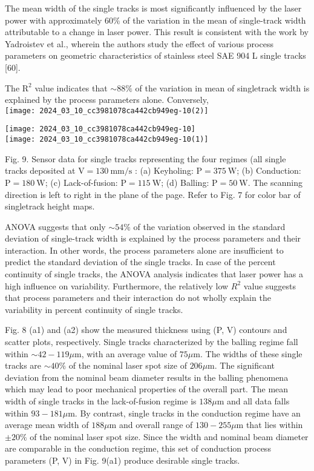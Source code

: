 \documentclass[10pt]{article}
\begin{document}
The mean width of the single tracks is most significantly influenced by the laser power with approximately $60 \%$ of the variation in the mean of single-track width attributable to a change in laser power. This result is consistent with the work by Yadroistev et al., wherein the authors study the effect of various process parameters on geometric characteristics of stainless steel SAE 904 L single tracks [60].

The $\mathrm{R}^{2}$ value indicates that $\sim 88 \%$ of the variation in mean of singletrack width is explained by the process parameters alone. Conversely,\\
\texttt{[image: 2024\_03\_10\_cc3981078ca442cb949eg-10(2)]}

\texttt{[image: 2024\_03\_10\_cc3981078ca442cb949eg-10]}\\
\texttt{[image: 2024\_03\_10\_cc3981078ca442cb949eg-10(1)]}

Fig. 9. Sensor data for single tracks representing the four regimes (all single tracks deposited at $\mathrm{V}=130 \mathrm{~mm} / \mathrm{s}$ : (a) Keyholing: $\mathrm{P}=375 \mathrm{~W}$; (b) Conduction: $\mathrm{P}=180 \mathrm{~W}$; (c) Lack-of-fusion: $\mathrm{P}=115 \mathrm{~W}$; (d) Balling: $\mathrm{P}=50 \mathrm{~W}$. The scanning direction is left to right in the plane of the page. Refer to Fig. 7 for color bar of singletrack height maps.

ANOVA suggests that only $\sim 54 \%$ of the variation observed in the standard deviation of single-track width is explained by the process parameters and their interaction. In other words, the process parameters alone are insufficient to predict the standard deviation of the single tracks. In case of the percent continuity of single tracks, the ANOVA analysis indicates that laser power has a high influence on variability. Furthermore, the relatively low $R^{2}$ value suggests that process parameters and their interaction do not wholly explain the variability in percent continuity of single tracks.

Fig. 8 (a1) and (a2) show the measured thickness using (P, V) contours and scatter plots, respectively. Single tracks characterized by the balling regime fall within $\sim 42-119 \mu \mathrm{m}$, with an average value of $75 \mu \mathrm{m}$. The widths of these single tracks are $\sim 40 \%$ of the nominal laser spot size of $206 \mu \mathrm{m}$. The significant deviation from the nominal beam diameter results in the balling phenomena which may lead to poor mechanical properties of the overall part. The mean width of single tracks in the lack-of-fusion regime is $138 \mu \mathrm{m}$ and all data falls within $93-181 \mu \mathrm{m}$. By contrast, single tracks in the conduction regime have an average mean width of $188 \mu \mathrm{m}$ and overall range of $130-255 \mu \mathrm{m}$ that lies within $\pm 20 \%$ of the nominal laser spot size. Since the width and nominal beam diameter are comparable in the conduction regime, this set of conduction process parameters (P, V) in Fig. 9(a1) produce desirable single tracks.
\end{document}
